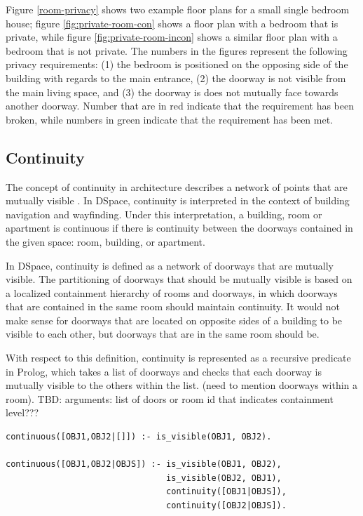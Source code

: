 \documentclass[12pt]{ucthesis}
\begin{document}
Figure \ref{room-privacy} shows two example floor plans for a small single bedroom house; figure \ref{fig:private-room-con} shows a floor plan with a bedroom that is  private, while figure \ref{fig:private-room-incon} shows a similar floor plan with a bedroom that is not private. The numbers in the figures represent the following privacy requirements: (1) the bedroom is positioned on the opposing side of the building with regards to the main entrance, (2) the doorway is not visible from the main living space, and (3) the doorway is does not mutually face towards another doorway. Number that are in red indicate that the requirement has been broken, while numbers in green indicate that the requirement has been met.


\subsection{Continuity}
The concept of continuity in architecture describes a network of points that are mutually visible \cite{Key}. In DSpace, continuity is interpreted in the context of building navigation and wayfinding. Under this interpretation, a building, room or apartment is continuous if there is continuity between the doorways contained in the given space: room, building, or apartment. 

In DSpace, continuity is defined as a network of doorways that are mutually visible. The partitioning of doorways that should be mutually visible is based on a localized containment hierarchy of rooms and doorways, in which doorways that are contained in the same room should maintain continuity. It would not make sense for doorways that are located on opposite sides of a building to be visible to each other, but doorways that are in the same room should be. 

With respect to this definition, continuity is represented as a recursive predicate in Prolog, which takes a list of doorways and checks that each doorway is mutually visible to the others within the list. (need to mention doorways within a room). TBD: arguments: list of doors or room id that indicates containment level???

\begin{verbatim}
continuous([OBJ1,OBJ2|[]]) :- is_visible(OBJ1, OBJ2).

continuous([OBJ1,OBJ2|OBJS]) :- is_visible(OBJ1, OBJ2),
	                            is_visible(OBJ2, OBJ1),
                                continuity([OBJ1|OBJS]),
                                continuity([OBJ2|OBJS]).
\end{verbatim}
\end{document}
